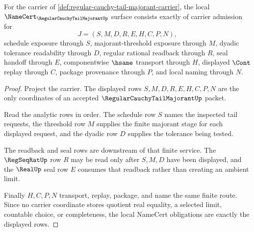 \begin{theorem}
\label{thm:regular-cauchy-tail-majorant-namecert-obligations}
For the carrier of \autoref{def:regular-cauchy-tail-majorant-carrier}, the local $\NameCert_{\RegularCauchyTailMajorantUp}$ surface consists exactly of carrier admission for
$$
J=(S,M,D,R,E,H,C,P,N),
$$
schedule exposure through $S$, majorant-threshold exposure through $M$, dyadic tolerance readability through $D$, regular rational readback through $R$, seal handoff through $E$, componentwise $\hsame$ transport through $H$, displayed $\Cont$ replay through $C$, package provenance through $P$, and local naming through $N$.
\end{theorem}
\begin{proof}
Project the carrier. The displayed rows $S,M,D,R,E,H,C,P,N$ are the only coordinates of an accepted $\RegularCauchyTailMajorantUp$ packet.

Read the analytic rows in order. The schedule row $S$ names the inspected tail requests, the threshold row $M$ supplies the finite majorant stage for each displayed request, and the dyadic row $D$ supplies the tolerance being tested.

The readback and seal rows are downstream of that finite service. The $\RegSeqRatUp$ row $R$ may be read only after $S,M,D$ have been displayed, and the $\RealUp$ seal row $E$ consumes that readback rather than creating an ambient limit.

Finally $H,C,P,N$ transport, replay, package, and name the same finite route. Since no carrier coordinate stores quotient real equality, a selected limit, countable choice, or completeness, the local NameCert obligations are exactly the displayed rows.
\end{proof}

\begin{closurestatus}{\RegularCauchyTailMajorantUp}
  \theoryclosure{\seedClosure}
  \formalstatus{\unformalizedV}
\end{closurestatus}
